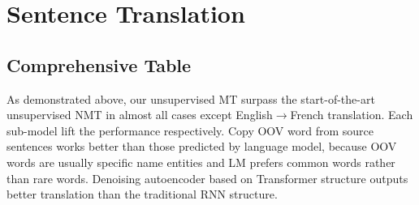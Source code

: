 \section{Sentence Translation}


\subsection{Comprehensive Table}
\begin{table}[H]
	
	\centering
{}
\end{table}
As demonstrated above, our unsupervised MT surpass the start-of-the-art unsupervised NMT in almost all cases except English$\rightarrow$French translation. Each sub-model lift the performance respectively. Copy OOV word from source sentences works better than those predicted by language model, because OOV words are usually specific name entities and LM prefers common words rather than rare words. Denoising autoencoder based on Transformer structure outputs better translation than the traditional RNN structure. 


